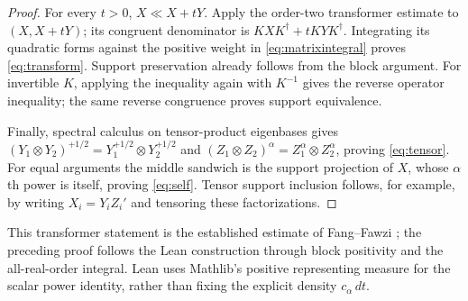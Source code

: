 \documentclass[11pt]{article}
\theoremstyle{remark}
\begin{document}
\begin{proof}
For every $t>0$, $X\ll X+tY$. Apply the order-two transformer estimate to
$(X,X+tY)$; its congruent denominator is $KXK^\dagger+tKYK^\dagger$.
Integrating its quadratic forms against the positive weight in
\eqref{eq:matrixintegral} proves \eqref{eq:transform}. Support preservation
already follows from the block argument. For invertible $K$, applying the
inequality again with $K^{-1}$ gives the reverse operator inequality;
the same reverse congruence proves support equivalence.

Finally, spectral calculus on tensor-product eigenbases gives
$(Y_1\otimes Y_2)^{+1/2}=Y_1^{+1/2}\otimes Y_2^{+1/2}$ and
$(Z_1\otimes Z_2)^\alpha=Z_1^\alpha\otimes Z_2^\alpha$, proving
\eqref{eq:tensor}. For equal arguments the middle sandwich is the support
projection of $X$, whose $\alpha$th power is itself, proving
\eqref{eq:self}. Tensor support inclusion follows, for example, by writing
$X_i=Y_iZ_i'$ and tensoring these factorizations.
\end{proof}

This transformer statement is the established estimate of
Fang--Fawzi \cite[Lemma~47]{FF21}; the preceding proof follows the Lean
construction through block positivity and the all-real-order integral.
Lean uses Mathlib's positive representing measure for the scalar power
identity, rather than fixing the explicit density $c_\alpha\,dt$.
\end{document}
